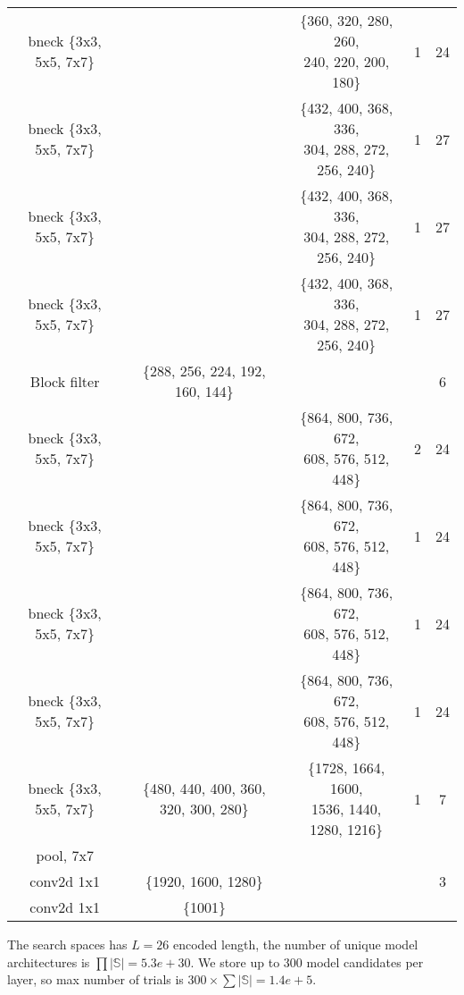 \begin{table}
\begin{center}
\begin{tabular}[hp]{c|c|c|c|c}
  bneck \{3x3, 5x5, 7x7\} & &\shortstack{\{360, 320, 280, 260, \\ 240, 220, 200, 180\}} &1 &24 \\
  bneck \{3x3, 5x5, 7x7\} & &\shortstack{\{432, 400, 368, 336, \\304, 288, 272, 256, 240\}} &1 &27 \\
  bneck \{3x3, 5x5, 7x7\} & &\shortstack{\{432, 400, 368, 336, \\304, 288, 272, 256, 240\}} &1 &27 \\
   bneck \{3x3, 5x5, 7x7\} & &\shortstack{\{432, 400, 368, 336, \\ 304, 288, 272, 256, 240\}} &1 &27 \\
\hline

Block filter &\{288, 256, 224, 192, 160, 144\} & & &6 \\
  bneck \{3x3, 5x5, 7x7\} & &\shortstack{\{864, 800, 736, 672, \\ 608, 576, 512, 448\}} &2 &24 \\
  bneck \{3x3, 5x5, 7x7\} & &\shortstack{\{864, 800, 736, 672, \\608, 576, 512, 448\}} &1 &24 \\
  bneck \{3x3, 5x5, 7x7\} & &\shortstack{\{864, 800, 736, 672, \\608, 576, 512, 448\}} &1 &24 \\
  bneck \{3x3, 5x5, 7x7\} & &\shortstack{\{864, 800, 736, 672, \\608, 576, 512, 448\}} &1 &24 \\
\hline
  bneck \{3x3, 5x5, 7x7\} &\{480, 440, 400, 360, 320, 300, 280\} &\shortstack{\{1728, 1664, 1600, \\ 1536, 1440, 1280, 1216\}} &1 &7 \\
\hline
  pool, 7x7  & & &\\
  conv2d 1x1  &\{1920, 1600, 1280\} & & &3 \\
  conv2d 1x1 &\{1001\} & & \\
\hline
\hline

\end{tabular}
\end{center}
\end{table}

The search spaces has $L=26$ encoded length, the number of unique model architectures is $\prod |\mathbb{S}| = 5.3e+30$.
We store up to 300 model candidates per layer, so max number of trials is $300 \times {\sum{|\mathbb{S}|}} = 1.4e+5$.


